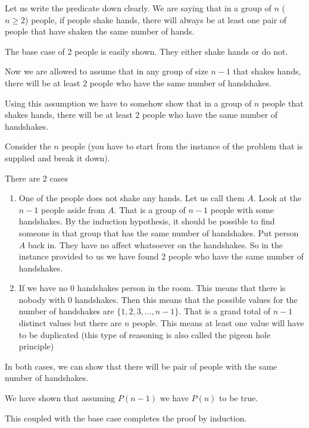 \documentclass[12pt]{article}
\begin{document}
\begin{Answer}
Let us write the predicate down clearly. We are saying that in a group of $n$ ($n \ge 2$) people, if people shake hands, there will always be at least one pair of people that have shaken the same number of hands.

The base case of 2 people is easily shown. They either shake hands or do not. 

Now we are allowed to assume that in any group of size $n-1$ that shakes hands, there will be at least 2 people who have the same number of handshakes.

Using this assumption we have to somehow show that in a group of $n$ people that shakes hands, there will be at least 2 people who have the same number of handshakes. 

Consider the $n$ people (you have to start from the instance of the problem that is supplied and break it down).

There are 2 cases 

\begin{enumerate}
\item One of the people does not shake any hands. Let us call them $A$. Look at the $n-1$ people aside from $A$. That is a group of $n-1$ people with some handshakes. By the induction hypothesis, it should be possible to find someone in that group that has the same number of handshakes. Put person $A$ back in. They have no affect whatsoever on the handshakes. So in the instance provided to us we have found 2 people who have the same number of handshakes.

\item If we have no 0 handshakes person in the room. This means that there is nobody with 0 handshakes. Then this means that the possible values for the number of handshakes are $\{1,2,3,\ldots, n-1\}$. That is a grand total of $n-1$ distinct values but there are $n$ people. This means at least one value will have to be duplicated (this type of reasoning is also called the pigeon hole principle)

\end{enumerate}

\end{Answer}

In both cases, we can show that there will be pair of people with the same number of handshakes. 

We have shown that assuming $P(n-1)$ we have $P(n)$ to be true.

This coupled with the base case completes the proof by induction.
\end{document}
